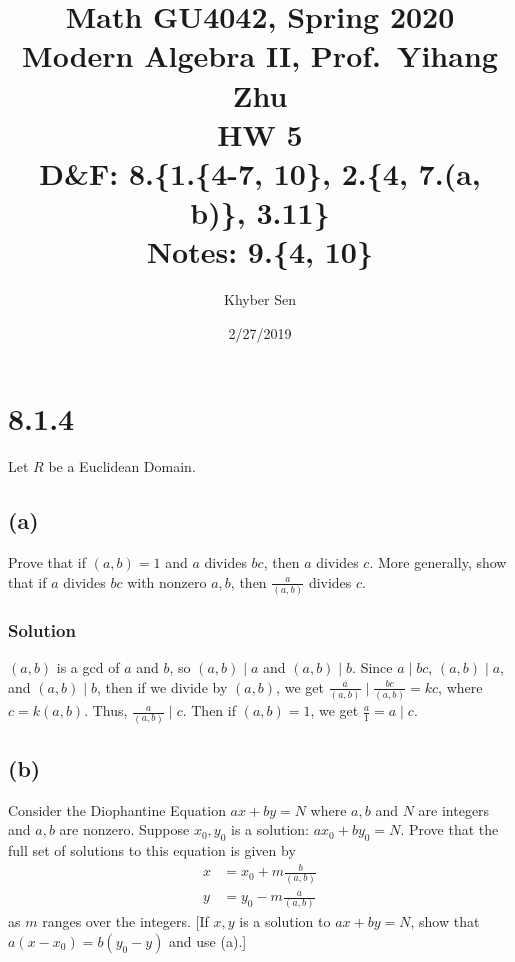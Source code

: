 \documentclass[fleqn]{article}
\title{
Math GU4042, Spring 2020 \\
Modern Algebra II, Prof.\ Yihang Zhu \\
HW 5 \\
D\&F: 8.\{1.\{4-7, 10\}, 2.\{4, 7.(a, b)\}, 3.11\} \\
Notes: 9.\{4, 10\} \\
}
\author{Khyber Sen}
\date{2/27/2019}
\begin{document}
    
    \maketitle
    
    \section{8.1.4}
    Let $R$ be a Euclidean Domain.
        
        \subsection{(a)}
        Prove that if $(a, b) = 1$ and $a$ divides $bc$, then $a$ divides $c$.  More generally, show that if $a$ divides $bc$ with nonzero $a, b$, then $\frac{a}{(a, b)}$ divides $c$.
            
            \subsubsection{Solution}
            $(a, b)$ is a gcd of $a$ and $b$, so $(a, b) \mid a$ and $(a, b) \mid b$.  Since $a \mid bc$, $(a, b) \mid a$, and $(a, b) \mid b$, then if we divide by $(a, b)$, we get $\frac{a}{(a, b)} \mid \frac{bc}{(a, b)} = kc$, where $c = k (a, b)$.  Thus, $\frac{a}{(a, b)} \mid c$.  Then if $(a, b) = 1$, we get $\frac{a}{1} = a \mid c$.
        
        \subsection{(b)}
        Consider the Diophantine Equation $ax + by = N$ where $a, b$ and $N$ are integers and $a, b$ are nonzero.  Suppose $x_0, y_0$ is a solution: $ax_0 + by_0 = N$.  Prove that the full set of solutions to this equation is given by
        \begin{align}
            x &= x_0 + m \frac{b}{(a, b)} \\
            y &= y_0 - m \frac{a}{(a, b)}
        \end{align}
        as $m$ ranges over the integers.  [If $x, y$ is a solution to $ax + by = N$, show that $a(x - x_0) = b(y_0 - y)$ and use (a).]
        
\end{document}
